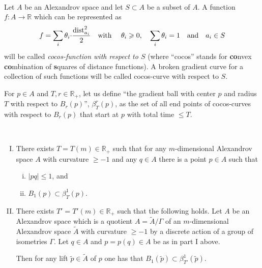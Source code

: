 \documentclass{amsart}
\begin{document}
\

Let $A$ be an Alexandrov space and let $S\subset A$ be a subset of $A$. A function $f\colon A\to \mathbb{R}$  which can be represented as
$$f=\sum_i \theta_i{\cdot} \frac{\operatorname{\rm dist}^2_{a_i}}{2}
\quad\text{with }\quad
\theta_i\geqslant 0,\quad
\sum_i \theta_i=1
\quad\text{and}\quad
a_i\in S$$
will be called {\sl cocos-function with respect to $S$}
(where ``cocos'' stands for
{\bf co}nvex {\bf co}mbination of {\bf s}quares of distance functions).
A broken gradient curve for a collection of such functions
will be called cocos-curve with respect to $S$.

For $p\in A$ and $T,r\in \mathbb{R}_+$,
let us define  ``the gradient ball with center $p$
and radius $T$ with respect to $B_r(p)$'', $\beta^r_T(p)$,
as the set of all end points of cocos-curves with respect to $B_r(p)$
that start at $p$
with total time $\le T$.

\begin{lem}\label{lem:gradb}\

\begin{enumerate}[(I)]
\item There exists $T=T(m)\in \mathbb{R}_+$
such that for any $m$-dimensional Alexandrov space $A$ with curvature $\ge -1$ and any $q\in A$ there is a point $p\in A$
such that
\begin{enumerate}[(i)]
\item $|pq|\le 1$, and
\item $B_1(p)\subset \beta^{1}_T(p)$.
\end{enumerate}
\item There exists $T'=T'(m)\in \mathbb{R}_+$
such that the following holds.
Let $A$ be an Alexandrov space
which is a quotient $A=\tilde A/\Gamma$
of an  $m$-dimensional Alexandrov space $\tilde A$ with curvature $\ge -1$
by a discrete action of a group of isometries $\Gamma$.
Let $q\in A$ and $p=p(q)\in A$
be as in part I above.

Then
for any lift $\tilde p \in \tilde A$ of $p$ one has that
$B_1(\tilde p)\subset \beta^{1}_{T'}(\tilde p)$.
\end{enumerate}
\end{lem}
\end{document}
